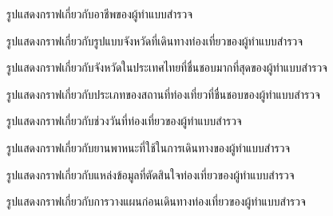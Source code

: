 \documentclass[12pt,oneside,openright,a4paper]{cpe-thai-project}
\begin{document}
\begin{figure}[!h]\centering
\setlength{\fboxrule}{0mm}
\caption{รูปแสดงกราฟเกี่ยวกับอาชีพของผู้ทำแบบสำรวจ}\label{fig:Fก.3}
\end{figure}

\begin{figure}[!h]\centering
\setlength{\fboxrule}{0mm}
\caption{รูปแสดงกราฟเกี่ยวกับรูปแบบจังหวัดที่เดินทางท่องเที่ยวของผู้ทำแบบสำรวจ}\label{fig:Fก.4}
\end{figure}

\begin{figure}[!h]\centering
\setlength{\fboxrule}{0mm}
\caption{รูปแสดงกราฟเกี่ยวกับจังหวัดในประเทศไทยที่ชื่นชอบมากที่สุดของผู้ทำแบบสำรวจ}\label{fig:Fก.5}
\end{figure}

\begin{figure}[!h]\centering
\setlength{\fboxrule}{0mm}
\caption{รูปแสดงกราฟเกี่ยวกับประเภทของสถานที่ท่องเที่ยวที่ชื่นชอบของผู้ทำแบบสำรวจ}\label{fig:Fก.6}
\end{figure}

\begin{figure}[!h]\centering
\setlength{\fboxrule}{0mm}
\caption{รูปแสดงกราฟเกี่ยวกับช่วงวันที่ท่องเที่ยวของผู้ทำแบบสำรวจ}\label{fig:Fก.7}
\end{figure}

\begin{figure}[!h]\centering
\setlength{\fboxrule}{0mm}
\caption{รูปแสดงกราฟเกี่ยวกับยานพาหนะที่ใช้ในการเดินทางของผู้ทำแบบสำรวจ}\label{fig:Fก.8}
\end{figure}

\begin{figure}[!h]\centering
\setlength{\fboxrule}{0mm}
\caption{รูปแสดงกราฟเกี่ยวกับแหล่งข้อมูลที่ตัดสินใจท่องเที่ยวของผู้ทำแบบสำรวจ}\label{fig:Fก.9}
\end{figure}

\begin{figure}[!h]\centering
\setlength{\fboxrule}{0mm}
\caption{รูปแสดงกราฟเกี่ยวกับการวางแผนก่อนเดินทางท่องเที่ยวของผู้ทำแบบสำรวจ}\label{fig:Fก.10}
\end{figure}
\end{document}

